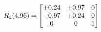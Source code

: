 \documentclass[preview]{standalone}
\begin{document}
\begin{align*}
\special{dvisvgm:raw <g id='unique000'>}R_{z}(4.96) = \begin{bmatrix}+0.24 & +0.97 & 0 \\-0.97 & +0.24 & 0 \\0 & 0 & 1\end{bmatrix}\special{dvisvgm:raw </g>}
\end{align*}
\end{document}
